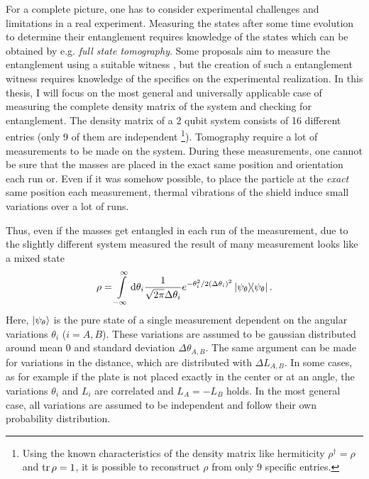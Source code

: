 For a complete picture, one has to consider experimental challenges and limitations in a real experiment. 
Measuring the states after some time evolution to determine their entanglement requires knowledge of the states which can be obtained by e.g. \emph{full state tomography}. Some proposals aim to measure the entanglement using a suitable witness \cite{Bose_2017,Chevalier_2020}, but the creation of such a entanglement witness requires knowledge of the specifics on the experimental realization.
In this thesis, I will focus on the most general and universally applicable case of measuring the complete density matrix of the system and checking for entanglement.
The density matrix of a 2 qubit system consists of 16 different entries (only 9 of them are independent \footnote{Using the known characteristics of the density matrix like hermiticity $\rho^\dagger = \rho$ and $\tr \rho = 1$, it is possible to reconstruct $\rho$ from only 9 specific entries.}).
Tomography require a lot of measurements to be made on the system.
During these measurements, one cannot be sure that the masses are placed in the exact same position and orientation each run or.
Even if it was somehow possible, to place the particle at the \textit{exact} same position each measurement, thermal vibrations of the shield induce small variations over a lot of runs.

Thus, even if the masses get entangled in each run of the measurement, due to the slightly different system measured the result of many measurement looks like a mixed state
\begin{equation}
  \rho = \int\limits_{-\infty}^{\infty} \dd \theta_i \frac{1}{\sqrt{2\pi}\Delta \theta_i} e^{-\theta_i^2/2(\Delta \theta_i)^2} \ketbra{\psi_\theta} .
\end{equation}
Here, $\ket{\psi_\theta}$ is the pure state of a single measurement dependent on the angular variations $\theta_i$ ($i=A,B$). These variations are assumed to be gaussian distributed around mean $0$ and standard deviation $\Delta \theta_{A,B}$.
The same argument can be made for variations in the distance, which are distributed with $\Delta L_{A,B}$.
In some cases, as for example if the plate is not placed exactly in the center or at an angle, the variations $\theta_i$ and $L_i$ are correlated and $L_A = -L_B$ holds.
In the most general case, all variations are assumed to be independent and follow their own probability distribution.

